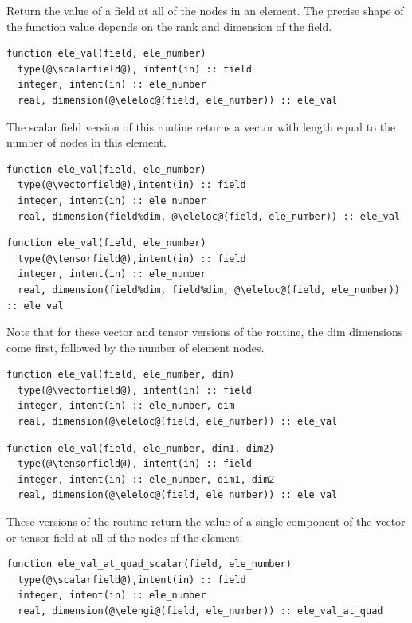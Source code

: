 \documentclass[a4paper, 11pt]{book}
\begin{document}
Return the value of a field at all of the nodes in an element. The precise
shape of the function value depends on the rank and dimension of the field.

\begin{lstlisting}
function ele_val(field, ele_number) 
  type(@\scalarfield@), intent(in) :: field
  integer, intent(in) :: ele_number
  real, dimension(@\eleloc@(field, ele_number)) :: ele_val
\end{lstlisting}
The scalar field version of this routine returns a vector with length equal
to the number of nodes in this element.

\begin{lstlisting}
function ele_val(field, ele_number)
  type(@\vectorfield@),intent(in) :: field
  integer, intent(in) :: ele_number
  real, dimension(field%dim, @\eleloc@(field, ele_number)) :: ele_val
\end{lstlisting}
\begin{lstlisting}
function ele_val(field, ele_number)
  type(@\tensorfield@),intent(in) :: field
  integer, intent(in) :: ele_number
  real, dimension(field%dim, field%dim, @\eleloc@(field, ele_number)) :: ele_val
\end{lstlisting}
Note that for these vector and tensor versions of the routine, the dim
dimensions come first, followed by the number of element nodes.

\begin{lstlisting}
function ele_val(field, ele_number, dim) 
  type(@\vectorfield@), intent(in) :: field
  integer, intent(in) :: ele_number, dim
  real, dimension(@\eleloc@(field, ele_number)) :: ele_val
\end{lstlisting}
\begin{lstlisting}
function ele_val(field, ele_number, dim1, dim2) 
  type(@\tensorfield@), intent(in) :: field
  integer, intent(in) :: ele_number, dim1, dim2
  real, dimension(@\eleloc@(field, ele_number)) :: ele_val
\end{lstlisting}
These versions of the routine return the value of a single component of the
vector or tensor field at all of the nodes of the element. 


\begin{lstlisting}
function ele_val_at_quad_scalar(field, ele_number)
  type(@\scalarfield@),intent(in) :: field
  integer, intent(in) :: ele_number
  real, dimension(@\elengi@(field, ele_number)) :: ele_val_at_quad  
\end{lstlisting}
\end{document}
